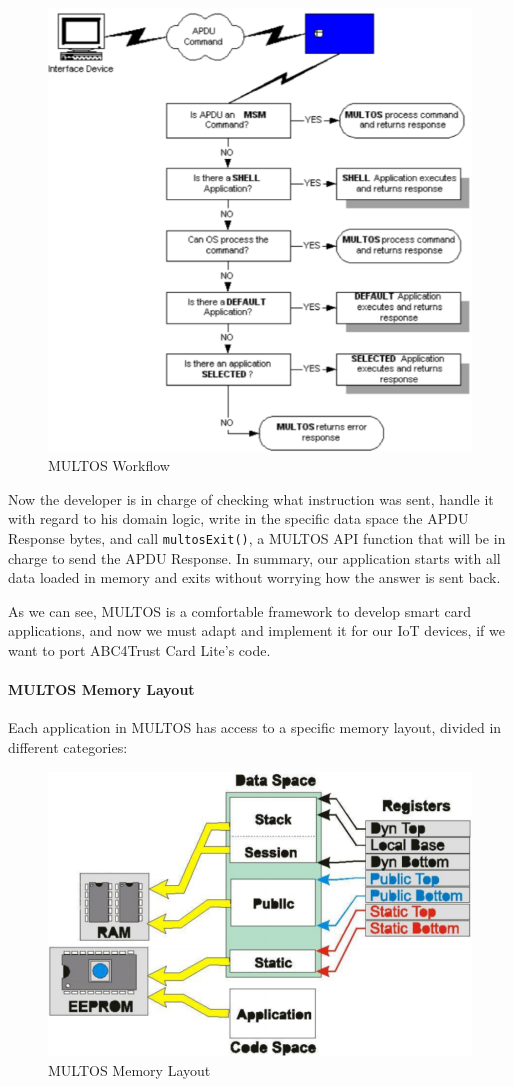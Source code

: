 \begin{figure}[bth]
	\begin{center}
		\includegraphics[width=0.6\linewidth]{gfx/multosWorkflow}
	\end{center}
	\caption{MULTOS Workflow}
	\label{fig:multosWorkflow}
\end{figure}

Now the developer is in charge of checking what instruction was sent, handle it with regard to his domain logic,  write in the specific data space the APDU Response bytes, and call \texttt{multosExit()}, a MULTOS API function that will be in charge to send the APDU Response.
In summary, our application starts with all data loaded in memory and exits without worrying how the answer is sent back.

As we can see, MULTOS is a comfortable framework to develop smart card applications, and now we must adapt and implement it for our IoT devices, if we want to port ABC4Trust Card Lite's code.



\paragraph{MULTOS Memory Layout}

Each application in MULTOS has access to a specific memory layout, divided in different categories:

\begin{figure}[bth]
	\begin{center}
		\includegraphics[width=0.8\linewidth]{gfx/multosMemLay}
	\end{center}
	\caption{MULTOS Memory Layout}
	\label{fig:multosMemLay}
\end{figure}


